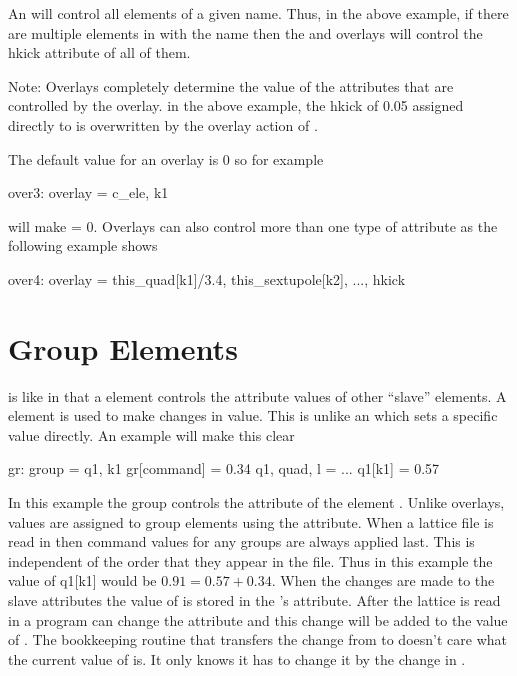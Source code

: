 An  will control all elements of a given name.  Thus, in
the above example, if there are multiple elements in 
with the name  then the  and  overlays
will control the hkick attribute of all of them.

Note: Overlays completely determine the value of the attributes that
are controlled by the overlay. in the above example, the hkick of 0.05
assigned directly to  is overwritten by the overlay action
of .

\noindent The default value for an overlay is 0 so for example
\begin{example}
  over3: overlay = {c\_ele}, k1
\end{example}
will make  = 0. Overlays can also control more than one
type of attribute as the following example shows
\begin{example}
  over4: overlay = {this\_quad[k1]/3.4, this\_sextupole[k2], ...}, hkick
\end{example}


\section{Group Elements}
\label{s:group}
 
 is like  in that a  element controls
the attribute values of other ``slave'' elements.  A 
element is used to make changes in value. This is unlike an
 which sets a specific value directly. An example will
make this clear
\begin{example}
  gr: group = {q1}, k1 
  gr[command] = 0.34 
  q1, quad, l = ...
  q1[k1] = 0.57
\end{example}
In this example the group  controls the  attribute of
the element . Unlike overlays, values are assigned to group
elements using the  attribute.  When a lattice file is
read in then command values for any groups are always applied
last. This is independent of the order that they appear in the file.
Thus in this example the value of q1[k1] would be $0.91 = 0.57 + 0.34$.
When the changes are made to the slave attributes the value of
 is stored in the 's  attribute.
After the lattice is read in a program can change the 
attribute and this change will be added to the value of
. The bookkeeping routine that transfers the change from
 to  doesn't care what the current value of
 is. It only knows it has to change it by the change in
.

